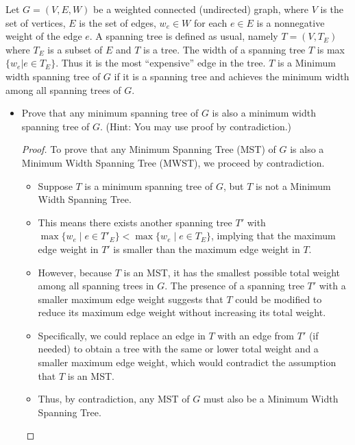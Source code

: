 \documentclass[12pt]{article}
\theoremstyle{plain}
\begin{document}
Let $G = (V,E,W)$ be a weighted connected (undirected) graph, where $V$ is the set of vertices, $E$ is the set of edges, $w_e \in W$ for each $e \in E$ is a nonnegative weight of the edge $e$. A spanning tree is defined as usual, namely $T = (V, T_E)$ where $T_E$ is a subset of  $E$ and $T$ is a tree. The width of a spanning tree $T$ is max $\{w_e | e \in T_E \}$.  Thus it is the most “expensive” edge in the tree. $T$ is a Minimum width spanning tree of $G$ if it is a spanning tree and achieves the minimum width among all spanning trees of $G.$ 
\begin{itemize} 
    \item[(a)] Prove that any minimum spanning tree of $G$ is also a minimum width spanning tree of $G$. (Hint: You may use proof by contradiction.)
    \begin{proof}
        To prove that any Minimum Spanning Tree (MST) of $G$ is also a Minimum Width Spanning Tree (MWST), we proceed by contradiction.
        \begin{itemize}
            \item Suppose $T$ is a minimum spanning tree of $G$, but $T$ is not a Minimum Width Spanning Tree.
            \item This means there exists another spanning tree $T'$ with $\max \{w_e \mid e \in T'_E\} < \max \{w_e \mid e \in T_E\}$, implying that the maximum edge weight in $T'$ is smaller than the maximum edge weight in $T$.
            \item However, because $T$ is an MST, it has the smallest possible total weight among all spanning trees in $G$. The presence of a spanning tree $T'$ with a smaller maximum edge weight suggests that $T$ could be modified to reduce its maximum edge weight without increasing its total weight.
            \item Specifically, we could replace an edge in $T$ with an edge from $T'$ (if needed) to obtain a tree with the same or lower total weight and a smaller maximum edge weight, which would contradict the assumption that $T$ is an MST.
            \item Thus, by contradiction, any MST of $G$ must also be a Minimum Width Spanning Tree.
        \end{itemize}
    \end{proof}
    

\end{itemize}
\end{document}
